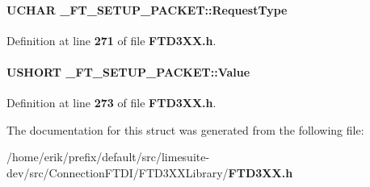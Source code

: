 \paragraph[{Request\+Type}]{\setlength{\rightskip}{0pt plus 5cm}U\+C\+H\+AR \+\_\+\+F\+T\+\_\+\+S\+E\+T\+U\+P\+\_\+\+P\+A\+C\+K\+E\+T\+::\+Request\+Type}\label{struct__FT__SETUP__PACKET_aeca71bc0f61668b6f093129b1e435ded}


Definition at line {\bf 271} of file {\bf F\+T\+D3\+X\+X.\+h}.

\paragraph[{Value}]{\setlength{\rightskip}{0pt plus 5cm}U\+S\+H\+O\+RT \+\_\+\+F\+T\+\_\+\+S\+E\+T\+U\+P\+\_\+\+P\+A\+C\+K\+E\+T\+::\+Value}\label{struct__FT__SETUP__PACKET_ab0f68148c25bb8b793514acc961be239}


Definition at line {\bf 273} of file {\bf F\+T\+D3\+X\+X.\+h}.



The documentation for this struct was generated from the following file\+:\begin{DoxyCompactItemize}
\item 
/home/erik/prefix/default/src/limesuite-\/dev/src/\+Connection\+F\+T\+D\+I/\+F\+T\+D3\+X\+X\+Library/{\bf F\+T\+D3\+X\+X.\+h}\end{DoxyCompactItemize}
